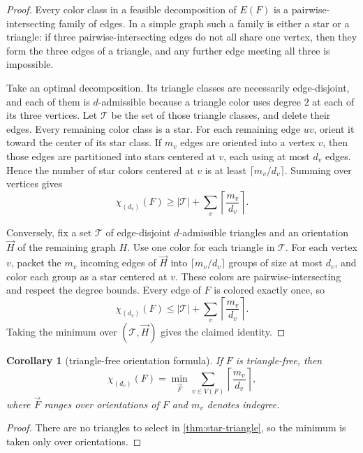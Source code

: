 \documentclass[11pt]{article}
\newtheorem{corollary}[theorem]{Corollary}
\theoremstyle{definition}
\newcommand{\Chi}{\chi}
\begin{document}
\begin{proof}
Every color class in a feasible decomposition of \(E(F)\) is a pairwise-intersecting family of edges. In a simple graph such a family is either a star or a triangle: if three pairwise-intersecting edges do not all share one vertex, then they form the three edges of a triangle, and any further edge meeting all three is impossible.

Take an optimal decomposition. Its triangle classes are necessarily edge-disjoint, and each of them is \(d\)-admissible because a triangle color uses degree \(2\) at each of its three vertices. Let \(\mathcal T\) be the set of those triangle classes, and delete their edges. Every remaining color class is a star. For each remaining edge \(uv\), orient it toward the center of its star class. If \(m_v\) edges are oriented into a vertex \(v\), then those edges are partitioned into stars centered at \(v\), each using at most \(d_v\) edges. Hence the number of star colors centered at \(v\) is at least \(\lceil m_v/d_v\rceil\). Summing over vertices gives
\[
\Chi_{(d_v)}(F)\ge |\mathcal T|+\sum_v \left\lceil \frac{m_v}{d_v}\right\rceil.
\]

Conversely, fix a set \(\mathcal T\) of edge-disjoint \(d\)-admissible triangles and an orientation \(\vec H\) of the remaining graph \(H\). Use one color for each triangle in \(\mathcal T\). For each vertex \(v\), packet the \(m_v\) incoming edges of \(\vec H\) into \(\lceil m_v/d_v\rceil\) groups of size at most \(d_v\), and color each group as a star centered at \(v\). These colors are pairwise-intersecting and respect the degree bounds. Every edge of \(F\) is colored exactly once, so
\[
\Chi_{(d_v)}(F)\le |\mathcal T|+\sum_v \left\lceil \frac{m_v}{d_v}\right\rceil.
\]
Taking the minimum over \((\mathcal T,\vec H)\) gives the claimed identity.
\end{proof}

\begin{corollary}[triangle-free orientation formula]\label{cor:trianglefree-orientation}
If \(F\) is triangle-free, then
\[
\Chi_{(d_v)}(F)=\min_{\vec F}\sum_{v\in V(F)} \left\lceil \frac{m_v}{d_v}\right\rceil,
\]
where \(\vec F\) ranges over orientations of \(F\) and \(m_v\) denotes indegree.
\end{corollary}

\begin{proof}
There are no triangles to select in \cref{thm:star-triangle}, so the minimum is taken only over orientations.
\end{proof}
\end{document}
